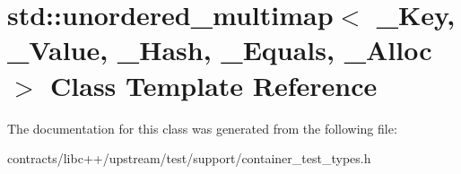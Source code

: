 \hypertarget{classstd_1_1unordered__multimap}{}\section{std\+:\+:unordered\+\_\+multimap$<$ \+\_\+\+Key, \+\_\+\+Value, \+\_\+\+Hash, \+\_\+\+Equals, \+\_\+\+Alloc $>$ Class Template Reference}
\label{classstd_1_1unordered__multimap}


The documentation for this class was generated from the following file\+:\begin{DoxyCompactItemize}
\item 
contracts/libc++/upstream/test/support/container\+\_\+test\+\_\+types.\+h\end{DoxyCompactItemize}

